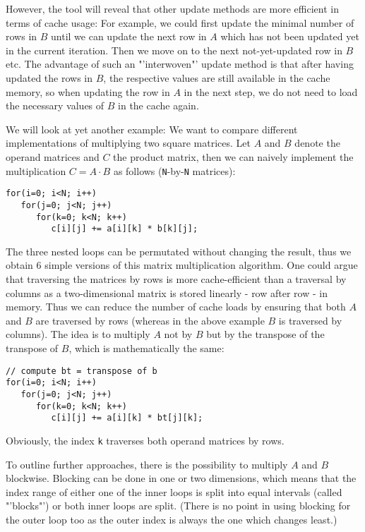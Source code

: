 However, the tool will reveal that other update methods are more efficient in terms of cache usage: For example, we could first update the minimal number of rows in $B$ until we can update the next row in $A$ which has not been updated yet in the current iteration. Then we move on to the next not-yet-updated row in $B$ etc. The advantage of such an "'interwoven"' update method is that after having updated the rows in $B$, the respective values are still available in the cache memory, so when updating the row in $A$ in the next step, we do not need to load the necessary values of $B$ in the cache again.

We will look at yet another example: We want to compare different implementations of multiplying two square matrices. Let $A$ and $B$ denote the operand matrices and $C$ the product matrix, then we can naively implement the multiplication $C=A \cdot B$ as follows (\texttt{N}-by-\texttt{N} matrices):
\begin{lstlisting}
for(i=0; i<N; i++)
   for(j=0; j<N; j++)
      for(k=0; k<N; k++)
         c[i][j] += a[i][k] * b[k][j];
\end{lstlisting}
The three nested loops can be permutated without changing the result, thus we obtain 6 simple versions of this matrix multiplication algorithm. One could argue that traversing the matrices by rows is more cache-efficient than a traversal by columns as a two-dimensional matrix is stored linearly - row after row - in memory. Thus we can reduce the number of cache loads by ensuring that both $A$ and $B$ are traversed by rows (whereas in the above example $B$ is traversed by columns). The idea is to multiply $A$ not by $B$ but by the transpose of the transpose of $B$, which is mathematically the same:
\begin{lstlisting}
// compute bt = transpose of b
for(i=0; i<N; i++)
   for(j=0; j<N; j++)
      for(k=0; k<N; k++)
         c[i][j] += a[i][k] * bt[j][k];
\end{lstlisting}
Obviously, the index \texttt{k} traverses both operand matrices by rows.

To outline further approaches, there is the possibility to multiply $A$ and $B$ blockwise. Blocking can be done in one or two dimensions, which means that the index range of either one of the inner loops is split into equal intervals (called "'blocks"') or both inner loops are split. (There is no point in using blocking for the outer loop too as the outer index is always the one which changes least.)

